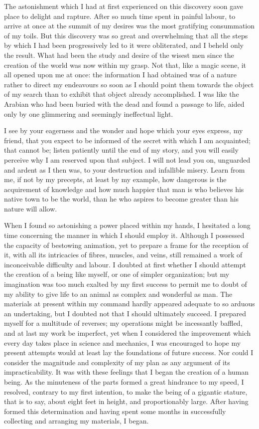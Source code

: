 \documentclass[12pt,openright]{book}
\begin{document}
The astonishment which I had at first experienced on this discovery soon gave place to delight and rapture. After so much time spent in painful labour, to arrive at once at the summit of my desires was the most gratifying consummation of my toils. But this discovery was so great and overwhelming that all the steps by which I had been progressively led to it were obliterated, and I beheld only the result. What had been the study and desire of the wisest men since the creation of the world was now within my grasp. Not that, like a magic scene, it all opened upon me at once: the information I had obtained was of a nature rather to direct my endeavours so soon as I should point them towards the object of my search than to exhibit that object already accomplished. I was like the Arabian who had been buried with the dead and found a passage to life, aided only by one glimmering and seemingly ineffectual light.

I see by your eagerness and the wonder and hope which your eyes express, my friend, that you expect to be informed of the secret with which I am acquainted; that cannot be; listen patiently until the end of my story, and you will easily perceive why I am reserved upon that subject. I will not lead you on, unguarded and ardent as I then was, to your destruction and infallible misery. Learn from me, if not by my precepts, at least by my example, how dangerous is the acquirement of knowledge and how much happier that man is who believes his native town to be the world, than he who aspires to become greater than his nature will allow.

When I found so astonishing a power placed within my hands, I hesitated a long time concerning the manner in which I should employ it. Although I possessed the capacity of bestowing animation, yet to prepare a frame for the reception of it, with all its intricacies of fibres, muscles, and veins, still remained a work of inconceivable difficulty and labour. I doubted at first whether I should attempt the creation of a being like myself, or one of simpler organization; but my imagination was too much exalted by my first success to permit me to doubt of my ability to give life to an animal as complex and wonderful as man. The materials at present within my command hardly appeared adequate to so arduous an undertaking, but I doubted not that I should ultimately succeed. I prepared myself for a multitude of reverses; my operations might be incessantly baffled, and at last my work be imperfect, yet when I considered the improvement which every day takes place in science and mechanics, I was encouraged to hope my present attempts would at least lay the foundations of future success. Nor could I consider the magnitude and complexity of my plan as any argument of its impracticability. It was with these feelings that I began the creation of a human being. As the minuteness of the parts formed a great hindrance to my speed, I resolved, contrary to my first intention, to make the being of a gigantic stature, that is to say, about eight feet in height, and proportionably large. After having formed this determination and having spent some months in successfully collecting and arranging my materials, I began.
\end{document}
